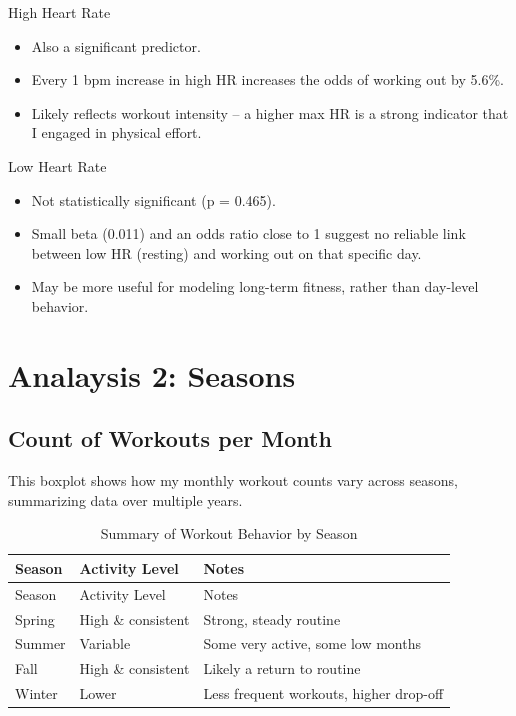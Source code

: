 \documentclass[
  11pt,
]{article}
\providecommand{\tightlist}{%
  \setlength{\itemsep}{0pt}\setlength{\parskip}{0pt}}
\begin{document}
High Heart Rate

\begin{itemize}
\tightlist
\item
  Also a significant predictor.
\item
  Every 1 bpm increase in high HR increases the odds of working out by
  5.6\%.
\item
  Likely reflects workout intensity -- a higher max HR is a strong
  indicator that I engaged in physical effort.
\end{itemize}

Low Heart Rate

\begin{itemize}
\tightlist
\item
  Not statistically significant (p = 0.465).
\item
  Small beta (0.011) and an odds ratio close to 1 suggest no reliable
  link between low HR (resting) and working out on that specific day.
\item
  May be more useful for modeling long-term fitness, rather than
  day-level behavior.
\end{itemize}

\section{Analaysis 2: Seasons}\label{analaysis-2-seasons}

\subsection{Count of Workouts per
Month}\label{count-of-workouts-per-month}

This boxplot shows how my monthly workout counts vary across seasons,
summarizing data over multiple years.

\begin{longtable}[]{@{}lll@{}}
\caption{Summary of Workout Behavior by Season}\tabularnewline
\toprule\noalign{}
Season & Activity Level & Notes \\
\midrule\noalign{}
\endfirsthead
\toprule\noalign{}
Season & Activity Level & Notes \\
\midrule\noalign{}
\endhead
\bottomrule\noalign{}
\endlastfoot
Spring & High \& consistent & Strong, steady routine \\
Summer & Variable & Some very active, some low months \\
Fall & High \& consistent & Likely a return to routine \\
Winter & Lower & Less frequent workouts, higher drop-off \\
\end{longtable}
\end{document}

